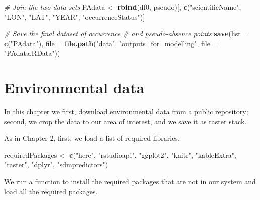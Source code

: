\documentclass[
]{book}
\newenvironment{Shaded}{\begin{snugshade}}{\end{snugshade}}
\newcommand{\AttributeTok}[1]{\textcolor[rgb]{0.13,0.29,0.53}{#1}}
\newcommand{\CommentTok}[1]{\textcolor[rgb]{0.56,0.35,0.01}{\textit{#1}}}
\newcommand{\FunctionTok}[1]{\textcolor[rgb]{0.13,0.29,0.53}{\textbf{#1}}}
\newcommand{\NormalTok}[1]{#1}
\newcommand{\OtherTok}[1]{\textcolor[rgb]{0.56,0.35,0.01}{#1}}
\newcommand{\StringTok}[1]{\textcolor[rgb]{0.31,0.60,0.02}{#1}}
\begin{document}
\begin{Shaded}
\begin{Highlighting}[]
\CommentTok{\# Join the two data sets}
\NormalTok{PAdata }\OtherTok{\textless{}{-}} \FunctionTok{rbind}\NormalTok{(df0, pseudo)[, }\FunctionTok{c}\NormalTok{(}\StringTok{"scientificName"}\NormalTok{,}
    \StringTok{"LON"}\NormalTok{, }\StringTok{"LAT"}\NormalTok{, }\StringTok{"YEAR"}\NormalTok{, }\StringTok{"occurrenceStatus"}\NormalTok{)]}

\CommentTok{\# Save the final dataset of occurrence}
\CommentTok{\# and pseudo{-}absence points}
\FunctionTok{save}\NormalTok{(}\AttributeTok{list =} \FunctionTok{c}\NormalTok{(}\StringTok{"PAdata"}\NormalTok{), }\AttributeTok{file =} \FunctionTok{file.path}\NormalTok{(}\StringTok{"data"}\NormalTok{,}
    \StringTok{"outputs\_for\_modelling"}\NormalTok{, }\AttributeTok{file =} \StringTok{"PAdata.RData"}\NormalTok{))}
\end{Highlighting}
\end{Shaded}

\chapter{Environmental data}\label{environmental-data}

In this chapter we first, download environmental data from a public repository; second, we crop the data to our area of interest, and we save it as raster stack.

As in Chapter 2, first, we load a list of required libraries.

\begin{Shaded}
\begin{Highlighting}[]
\NormalTok{requiredPackages }\OtherTok{\textless{}{-}} \FunctionTok{c}\NormalTok{(}\StringTok{"here"}\NormalTok{, }\StringTok{"rstudioapi"}\NormalTok{,}
    \StringTok{"ggplot2"}\NormalTok{, }\StringTok{"knitr"}\NormalTok{, }\StringTok{"kableExtra"}\NormalTok{, }\StringTok{"raster"}\NormalTok{,}
    \StringTok{"dplyr"}\NormalTok{, }\StringTok{"sdmpredictors"}\NormalTok{)}
\end{Highlighting}
\end{Shaded}

We run a function to install the required packages that are not in our system and load all the required packages.
\end{document}
